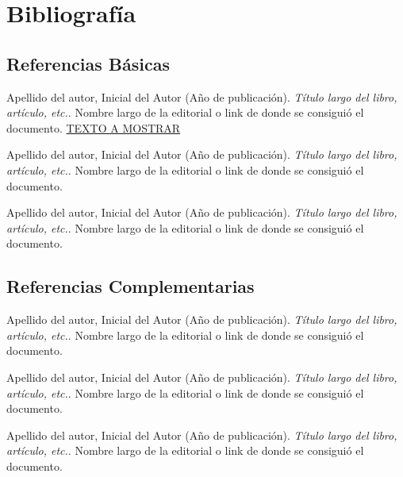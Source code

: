 \section{Bibliografía}

\subsection*{Referencias Básicas}

\hangindent=1in
Apellido del autor, Inicial del Autor (Año de publicación). \textit{Título largo del libro, artículo, etc.}. Nombre largo de la editorial o link de donde se consiguió el documento. \hyperlink{ENLACE}{TEXTO A MOSTRAR}

\hangindent=1in
Apellido del autor, Inicial del Autor (Año de publicación). \textit{Título largo del libro, artículo, etc.}. Nombre largo de la editorial o link de donde se consiguió el documento.

\hangindent=1in
Apellido del autor, Inicial del Autor (Año de publicación). \textit{Título largo del libro, artículo, etc.}. Nombre largo de la editorial o link de donde se consiguió el documento.

\subsection*{Referencias Complementarias}

\hangindent=1in
Apellido del autor, Inicial del Autor (Año de publicación). \textit{Título largo del libro, artículo, etc.}. Nombre largo de la editorial o link de donde se consiguió el documento.

\hangindent=1in
Apellido del autor, Inicial del Autor (Año de publicación). \textit{Título largo del libro, artículo, etc.}. Nombre largo de la editorial o link de donde se consiguió el documento.

\hangindent=1in
Apellido del autor, Inicial del Autor (Año de publicación). \textit{Título largo del libro, artículo, etc.}. Nombre largo de la editorial o link de donde se consiguió el documento.
\pagebreak